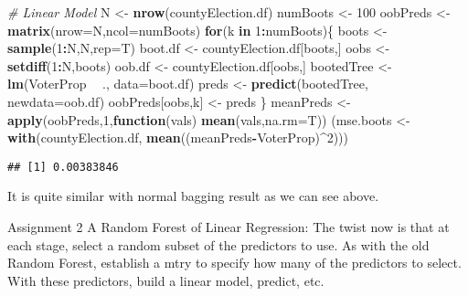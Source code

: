 \documentclass[]{article}
\newenvironment{Shaded}{\begin{snugshade}}{\end{snugshade}}
\newcommand{\CommentTok}[1]{\textcolor[rgb]{0.56,0.35,0.01}{\textit{#1}}}
\newcommand{\ControlFlowTok}[1]{\textcolor[rgb]{0.13,0.29,0.53}{\textbf{#1}}}
\newcommand{\DataTypeTok}[1]{\textcolor[rgb]{0.13,0.29,0.53}{#1}}
\newcommand{\DecValTok}[1]{\textcolor[rgb]{0.00,0.00,0.81}{#1}}
\newcommand{\KeywordTok}[1]{\textcolor[rgb]{0.13,0.29,0.53}{\textbf{#1}}}
\newcommand{\NormalTok}[1]{#1}
\newcommand{\OperatorTok}[1]{\textcolor[rgb]{0.81,0.36,0.00}{\textbf{#1}}}
\newcommand{\StringTok}[1]{\textcolor[rgb]{0.31,0.60,0.02}{#1}}
\begin{document}
\begin{Shaded}
\begin{Highlighting}[]
\CommentTok{# Linear Model}
\NormalTok{N <-}\StringTok{ }\KeywordTok{nrow}\NormalTok{(countyElection.df)}
\NormalTok{numBoots <-}\StringTok{ }\DecValTok{100}
\NormalTok{oobPreds <-}\StringTok{ }\KeywordTok{matrix}\NormalTok{(}\DataTypeTok{nrow=}\NormalTok{N,}\DataTypeTok{ncol=}\NormalTok{numBoots)}
\ControlFlowTok{for}\NormalTok{(k }\ControlFlowTok{in} \DecValTok{1}\OperatorTok{:}\NormalTok{numBoots)\{}
\NormalTok{  boots <-}\StringTok{ }\KeywordTok{sample}\NormalTok{(}\DecValTok{1}\OperatorTok{:}\NormalTok{N,N,}\DataTypeTok{rep=}\NormalTok{T) }
\NormalTok{  boot.df <-}\StringTok{ }\NormalTok{countyElection.df[boots,]}
\NormalTok{  oobs <-}\StringTok{ }\KeywordTok{setdiff}\NormalTok{(}\DecValTok{1}\OperatorTok{:}\NormalTok{N,boots) }
\NormalTok{  oob.df <-}\StringTok{ }\NormalTok{countyElection.df[oobs,] }
\NormalTok{  bootedTree <-}\StringTok{ }\KeywordTok{lm}\NormalTok{(VoterProp }\OperatorTok{~}\StringTok{ }\NormalTok{.,}
                   \DataTypeTok{data=}\NormalTok{boot.df)}
\NormalTok{  preds <-}\StringTok{ }\KeywordTok{predict}\NormalTok{(bootedTree, }\DataTypeTok{newdata=}\NormalTok{oob.df)}
\NormalTok{  oobPreds[oobs,k] <-}\StringTok{ }\NormalTok{preds }
\NormalTok{\}}
\NormalTok{meanPreds <-}\StringTok{ }\KeywordTok{apply}\NormalTok{(oobPreds,}\DecValTok{1}\NormalTok{,}\ControlFlowTok{function}\NormalTok{(vals) }\KeywordTok{mean}\NormalTok{(vals,}\DataTypeTok{na.rm=}\NormalTok{T))}
\NormalTok{(mse.boots <-}\StringTok{ }\KeywordTok{with}\NormalTok{(countyElection.df, }\KeywordTok{mean}\NormalTok{((meanPreds}\OperatorTok{-}\NormalTok{VoterProp)}\OperatorTok{^}\DecValTok{2}\NormalTok{)))}
\end{Highlighting}
\end{Shaded}

\begin{verbatim}
## [1] 0.00383846
\end{verbatim}

It is quite similar with normal bagging result as we can see above.

Assignment 2 A Random Forest of Linear Regression: The twist now is that
at each stage, select a random subset of the predictors to use. As with
the old Random Forest, establish a mtry to specify how many of the
predictors to select. With these predictors, build a linear model,
predict, etc.
\end{document}
